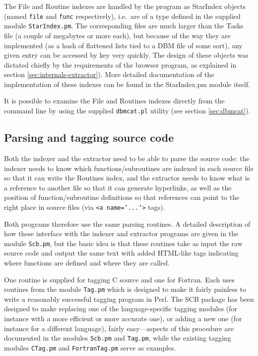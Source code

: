 \documentclass[twoside,11pt]{article}
\newcommand{\xlabel}[1]{}
\renewcommand{\_}{\texttt{\symbol{95}}}
\begin{document}
The File and Routine indexes are
handled by the program as StarIndex 
objects (named {\tt file} and {\tt func} respectively), 
i.e.\ are of a type 
defined in the supplied module {\tt StarIndex.pm}.
The corresponding files are much larger than the Tasks file 
(a couple of megabytes or more each),
but because of the way they are implemented 
(as a hash of flattened lists tied to a DBM file of some sort), 
any given entry can be accessed by key very quickly.
The design of these objects was dictated chiefly by the requirements
of the browser program, as explained in 
section \ref{sec:internals-extractor}).
More detailed documentation of the implementation of these indexes
can be found in the StarIndex.pm module itself.

It is possible to examine the File and Routines indexes 
directly from the command line by using the supplied {\tt dbmcat.pl}
utility (see section \ref{sec:dbmcat}).



\subsection{\xlabel{sec:internals-tagging}\label{sec:internals-tagging}Parsing and tagging source code}

Both the indexer and the extractor need to be able to parse the 
source code: the indexer needs to know which
functions/subroutines are indexed in each source file so that
it can write the Routines index, and the extractor needs to know
what is a reference to another file so that it can generate
hyperlinks, as well as the position of function/subroutine 
definitions so that references can point to the right place in
source files (via {\tt <a~name='...'>} tags).

Both programs therefore use the same parsing routines. 
A detailed description of how these interface with
the indexer and extractor programs are given in the 
module {\tt Scb.pm}, but the basic idea is that these routines
take as input the raw source code and output the same text
with added HTML-like tags indicating where functions are defined 
and where they are called.

One routine is supplied for tagging C source and one for 
Fortran.  
Each uses routines from the module {\tt Tag.pm}
which is designed to make it fairly painless to write a
reasonably successful tagging program in Perl.
The SCB package has been designed to make
replacing one of the language-specific tagging modules 
(for instance with a more efficient or more accurate one),
or adding a new one (for instance for a different language), 
fairly easy---aspects of this 
procedure are documented in the modules {\tt Scb.pm} and {\tt Tag.pm},
while the existing tagging modules {\tt CTag.pm} and {\tt FortranTag.pm}
serve as examples.
\end{document}
